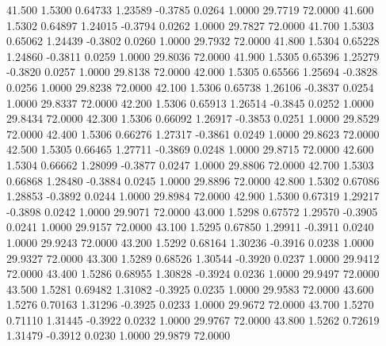   41.500   1.5300   0.64733   1.23589  -0.3785   0.0264   1.0000  29.7719  72.0000
  41.600   1.5302   0.64897   1.24015  -0.3794   0.0262   1.0000  29.7827  72.0000
  41.700   1.5303   0.65062   1.24439  -0.3802   0.0260   1.0000  29.7932  72.0000
  41.800   1.5304   0.65228   1.24860  -0.3811   0.0259   1.0000  29.8036  72.0000
  41.900   1.5305   0.65396   1.25279  -0.3820   0.0257   1.0000  29.8138  72.0000
  42.000   1.5305   0.65566   1.25694  -0.3828   0.0256   1.0000  29.8238  72.0000
  42.100   1.5306   0.65738   1.26106  -0.3837   0.0254   1.0000  29.8337  72.0000
  42.200   1.5306   0.65913   1.26514  -0.3845   0.0252   1.0000  29.8434  72.0000
  42.300   1.5306   0.66092   1.26917  -0.3853   0.0251   1.0000  29.8529  72.0000
  42.400   1.5306   0.66276   1.27317  -0.3861   0.0249   1.0000  29.8623  72.0000
  42.500   1.5305   0.66465   1.27711  -0.3869   0.0248   1.0000  29.8715  72.0000
  42.600   1.5304   0.66662   1.28099  -0.3877   0.0247   1.0000  29.8806  72.0000
  42.700   1.5303   0.66868   1.28480  -0.3884   0.0245   1.0000  29.8896  72.0000
  42.800   1.5302   0.67086   1.28853  -0.3892   0.0244   1.0000  29.8984  72.0000
  42.900   1.5300   0.67319   1.29217  -0.3898   0.0242   1.0000  29.9071  72.0000
  43.000   1.5298   0.67572   1.29570  -0.3905   0.0241   1.0000  29.9157  72.0000
  43.100   1.5295   0.67850   1.29911  -0.3911   0.0240   1.0000  29.9243  72.0000
  43.200   1.5292   0.68164   1.30236  -0.3916   0.0238   1.0000  29.9327  72.0000
  43.300   1.5289   0.68526   1.30544  -0.3920   0.0237   1.0000  29.9412  72.0000
  43.400   1.5286   0.68955   1.30828  -0.3924   0.0236   1.0000  29.9497  72.0000
  43.500   1.5281   0.69482   1.31082  -0.3925   0.0235   1.0000  29.9583  72.0000
  43.600   1.5276   0.70163   1.31296  -0.3925   0.0233   1.0000  29.9672  72.0000
  43.700   1.5270   0.71110   1.31445  -0.3922   0.0232   1.0000  29.9767  72.0000
  43.800   1.5262   0.72619   1.31479  -0.3912   0.0230   1.0000  29.9879  72.0000
